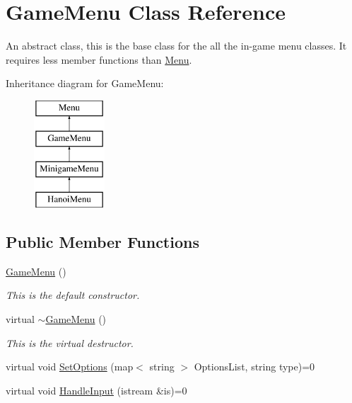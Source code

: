 \hypertarget{classGameMenu}{\section{Game\-Menu Class Reference}
\label{classGameMenu}
}


An abstract class, this is the base class for the all the in-\/game menu classes. It requires less member functions than \hyperlink{classMenu}{Menu}.  


Inheritance diagram for Game\-Menu\-:\begin{figure}[H]
\begin{center}
\leavevmode
\includegraphics[height=4.000000cm]{classGameMenu}
\end{center}
\end{figure}
\subsection*{Public Member Functions}
\begin{DoxyCompactItemize}
\item 
\hypertarget{classGameMenu_ae31c50148abf655297a2a3eab53c15a3}{\hyperlink{classGameMenu_ae31c50148abf655297a2a3eab53c15a3}{Game\-Menu} ()}\label{classGameMenu_ae31c50148abf655297a2a3eab53c15a3}

\begin{DoxyCompactList}\small\item\em This is the default constructor. \end{DoxyCompactList}\item 
\hypertarget{classGameMenu_a8901f02e327b01a79b6e10a580154c44}{virtual \hyperlink{classGameMenu_a8901f02e327b01a79b6e10a580154c44}{$\sim$\-Game\-Menu} ()}\label{classGameMenu_a8901f02e327b01a79b6e10a580154c44}

\begin{DoxyCompactList}\small\item\em This is the virtual destructor. \end{DoxyCompactList}\item 
virtual void \hyperlink{classGameMenu_a25172d8d311df4f7b79074d60f74642e}{Set\-Options} (map$<$ string $>$ Options\-List, string type)=0
\item 
virtual void \hyperlink{classGameMenu_a02ba09feedece5773f44ba865ccffb42}{Handle\-Input} (istream \&is)=0
\end{DoxyCompactItemize}
